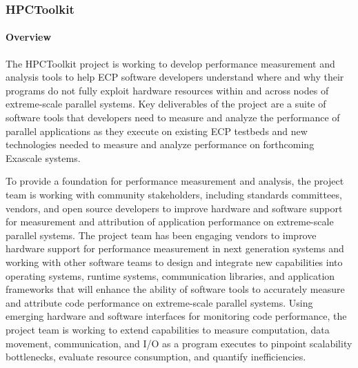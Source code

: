 
\subsubsection{HPCToolkit} 
\paragraph{Overview} 

The HPCToolkit project is working to develop performance measurement and analysis tools to help ECP software developers understand where and why their programs do not fully exploit hardware resources within and across nodes of extreme-scale parallel systems. Key deliverables of the project are a suite of software tools that developers need to measure and analyze the performance of parallel applications as they execute on existing ECP testbeds and new technologies needed to measure and analyze performance on forthcoming Exascale systems.

To provide a foundation for performance measurement and analysis, the project team is working with community stakeholders, including standards committees, vendors, and open source developers to improve hardware and software support for measurement and attribution of application performance on extreme-scale parallel systems. The project team has been engaging vendors to improve
 hardware support for performance measurement in next generation systems and working with other software teams to design and integrate new capabilities into operating systems, runtime systems, communication libraries, and application frameworks that will enhance the ability of software tools to accurately measure and attribute code performance on extreme-scale parallel systems.  Using emerging hardware and software interfaces for monitoring code performance, the project team is working to extend capabilities to measure computation, data movement, communication, and I/O as a program executes to pinpoint scalability bottlenecks, evaluate resource consumption, and quantify inefficiencies. 





